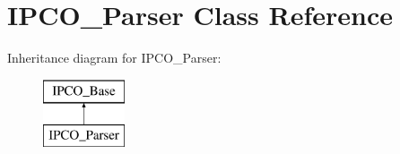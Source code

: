 \hypertarget{class_i_p_c_o___parser}{\section{I\-P\-C\-O\-\_\-\-Parser Class Reference}
\label{class_i_p_c_o___parser}
}
Inheritance diagram for I\-P\-C\-O\-\_\-\-Parser\-:\begin{figure}[H]
\begin{center}
\leavevmode
\includegraphics[height=2.000000cm]{class_i_p_c_o___parser}
\end{center}
\end{figure}
